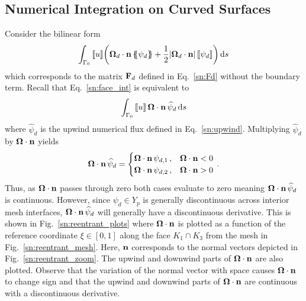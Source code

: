 \documentclass[../doc.tex]{subfiles}
\begin{document}
\subsection{Numerical Integration on Curved Surfaces}
Consider the bilinear form 
	\begin{equation} \label{sn:face_int}
		\int_{\Gamma_0} \left\llbracket u \right\rrbracket\!\left( \boldsymbol{\Omega}_d\cdot\boldsymbol{\mathrm{n}}\left\{\!\!\left\{\psi_d\right\}\!\!\right\} + \frac{1}{2}|\boldsymbol{\Omega}_d\cdot\boldsymbol{\mathrm{n}}|\left\llbracket\psi_d \right\rrbracket \right) \mathop{}\!\mathrm{d} s
	\end{equation}
which corresponds to the matrix $\boldsymbol{\mathrm{F}}_d$ defined in Eq.~\ref{sn:Fd} without the boundary term. Recall that Eq.~\ref{sn:face_int} is equivalent to 
	\begin{equation}
		\int_{\Gamma_0} \left\llbracket u \right\rrbracket\boldsymbol{\Omega}\cdot\boldsymbol{\mathrm{n}}\,\widehat{\psi}_d \mathop{}\!\mathrm{d} s 
	\end{equation}
where $\widehat{\psi}_d$ is the upwind numerical flux defined in Eq.~\ref{sn:upwind}. Multiplying $\widehat{\psi}_d$ by $\boldsymbol{\Omega}\cdot\boldsymbol{\mathrm{n}}$ yields 
	\begin{equation}
		\boldsymbol{\Omega}\cdot\boldsymbol{\mathrm{n}}\,\widehat{\psi}_d = \begin{cases}
			\boldsymbol{\Omega}\cdot\boldsymbol{\mathrm{n}}\,\psi_{d,1} \,, & \boldsymbol{\Omega}\cdot\boldsymbol{\mathrm{n}}<0 \\ 
			\boldsymbol{\Omega}\cdot\boldsymbol{\mathrm{n}}\,\psi_{d,2} \,, & \boldsymbol{\Omega}\cdot\boldsymbol{\mathrm{n}}>0 
		\end{cases} \,. 
	\end{equation}
Thus, as $\boldsymbol{\Omega}\cdot\boldsymbol{\mathrm{n}}$ passes through zero both cases evaluate to zero meaning $\boldsymbol{\Omega}\cdot\boldsymbol{\mathrm{n}}\,\widehat{\psi}_d$ is continuous. However, since $\psi_d \in Y_p$ is generally discontinuous across interior mesh interfaces, $\boldsymbol{\Omega}\cdot\boldsymbol{\mathrm{n}}\,\widehat{\psi}_d$ will generally have a discontinuous derivative. This is shown in Fig.~\ref{sn:reentrant_plots} where $\boldsymbol{\Omega}\cdot\boldsymbol{\mathrm{n}}$ is plotted as a function of the reference coordinate $\xi\in[0,1]$ along the face $K_1 \cap K_3$ from the mesh in Fig.~\ref{sn:reentrant_mesh}. Here, $\boldsymbol{\mathrm{n}}$ corresponds to the normal vectors depicted in Fig.~\ref{sn:reentrant_zoom}. The upwind and downwind parts of $\boldsymbol{\Omega}\cdot\boldsymbol{\mathrm{n}}$ are also plotted. Observe that the variation of the normal vector with space causes $\boldsymbol{\Omega}\cdot\boldsymbol{\mathrm{n}}$ to change sign and that the upwind and downwind parts of $\boldsymbol{\Omega}\cdot\boldsymbol{\mathrm{n}}$ are continuous with a discontinuous derivative. 
\end{document}
